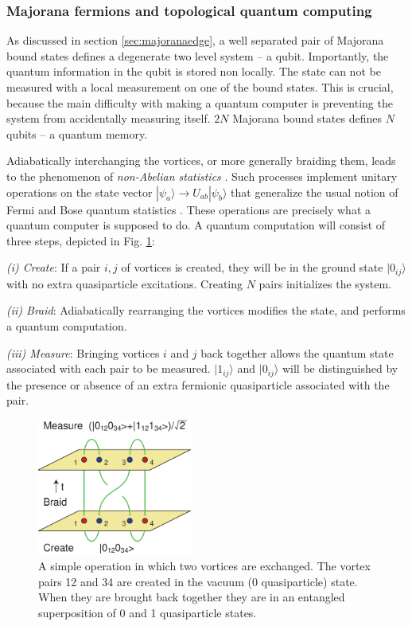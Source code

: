 \documentclass[twocolumn,floatfix,showpacs,rmp,aps]{revtex4}
\begin{document}
\subsubsection{Majorana fermions and topological quantum computing}
\label{sec:qcompute}

As discussed in section \ref{sec:majoranaedge}, a well separated pair of
Majorana bound states
defines a degenerate two level system -- a qubit.  Importantly, the quantum
information in the qubit is stored non locally.  The state
can not be measured with a local measurement on one of the bound states.  This
is crucial, because the main difficulty with making a quantum computer is
preventing the system from accidentally measuring itself.  $2N$ Majorana bound states
defines $N$ qubits -- a quantum memory.

Adiabatically interchanging the vortices, or more generally braiding them, leads to
the phenomenon of {\it non-Abelian statistics} \cite{mooreread91}.  Such processes implement unitary
operations on the state vector $|\psi_a\rangle\rightarrow
U_{ab}|\psi_b\rangle$ that generalize the usual notion of Fermi and Bose quantum
statistics \cite{nayak96,ivanov01}.  These operations are precisely
what a quantum computer is supposed to do.
A quantum computation will consist of three steps, depicted in Fig. \ref{fig:braid}:

{\it (i) Create}:  If a pair $i, j$ of
vortices is created, they will be in the ground state $|0_{ij}\rangle$
with no extra quasiparticle excitations.  Creating $N$ pairs
initializes the system.

{\it (ii) Braid}:  Adiabatically rearranging
the vortices modifies the state, and performs a quantum computation.

{\it (iii) Measure}: Bringing vortices $i$ and $j$ back together allows
the quantum state associated with each pair to be measured.
$|1_{ij}\rangle$ and $|0_{ij}\rangle$ will be distinguished by the presence or
absence of an extra fermionic quasiparticle associated with the pair.

\begin{figure}
\includegraphics[width=2in]{Fig19}
\caption{A simple operation in which two vortices are exchanged.  The vortex pairs 12 and 34 are
created in the vacuum (0 quasiparticle) state.
When they are brought back together they are in an entangled superposition of
0 and 1 quasiparticle states.}
\label{fig:braid}
\end{figure}
\end{document}
